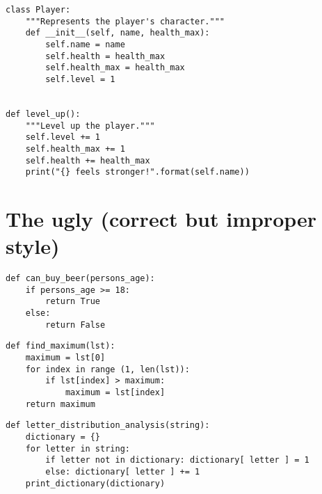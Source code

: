 \documentclass[12pt,a4paper]{article}
\begin{document}
\begin{lstlisting}
class Player:
    """Represents the player's character."""
    def __init__(self, name, health_max):
        self.name = name
        self.health = health_max
        self.health_max = health_max
        self.level = 1


def level_up():
    """Level up the player."""
    self.level += 1
    self.health_max += 1
    self.health += health_max
    print("{} feels stronger!".format(self.name))
\end{lstlisting}

\section*{The ugly (correct but improper style)}

\begin{lstlisting}
def can_buy_beer(persons_age):
    if persons_age >= 18:
        return True
    else:
        return False
\end{lstlisting}

\begin{lstlisting}
def find_maximum(lst):
    maximum = lst[0]
    for index in range (1, len(lst)):
        if lst[index] > maximum:
            maximum = lst[index]
    return maximum
\end{lstlisting}

\begin{lstlisting}
def letter_distribution_analysis(string):
    dictionary = {}
    for letter in string:
        if letter not in dictionary: dictionary[ letter ] = 1
        else: dictionary[ letter ] += 1
    print_dictionary(dictionary)
\end{lstlisting}
\end{document}
